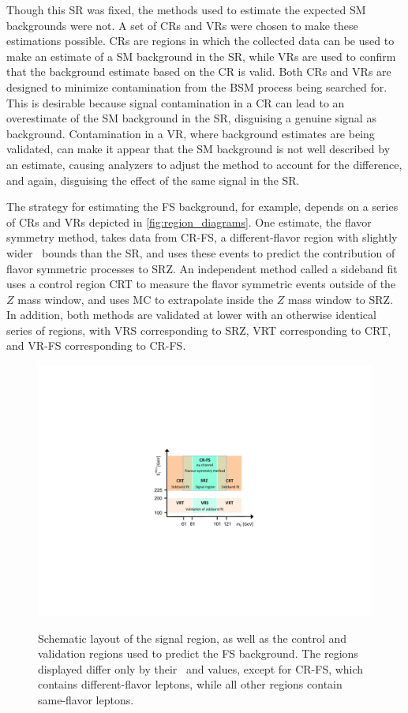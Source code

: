 Though this \ac{SR} was fixed, the methods used to estimate the expected \ac{SM} backgrounds were not. A set of \acfp{CR} and \acfp{VR} were chosen to make these estimations possible. \acp{CR} are regions in which the collected data can be used to make an estimate of a \ac{SM} background in the \ac{SR}, while \acp{VR} are used to confirm that the background estimate based on the \ac{CR} is valid. Both \acp{CR} and \acp{VR} are designed to minimize contamination from the \ac{BSM} process being searched for. This is desirable because signal contamination in a \ac{CR} can lead to an overestimate of the \ac{SM} background in the \ac{SR}, disguising a genuine signal as background. Contamination in a \ac{VR}, where background estimates are being validated, can make it appear that the \ac{SM} background is not well described by an estimate, causing analyzers to adjust the method to account for the difference, and again, disguising the effect of the same signal in the \ac{SR}. 

The strategy for estimating the \ac{FS} background, for example, depends on a series of \acp{CR} and \acp{VR} depicted in \autoref{fig:region_diagrams}. One estimate, the flavor symmetry method, takes data from CR-FS, a different-flavor region with slightly wider \mll~bounds than the \ac{SR}, and uses these events to predict the contribution of flavor symmetric processes to SRZ. An independent method called a sideband fit uses a control region CRT to measure the flavor symmetric events outside of the $Z$ mass window, and uses \ac{MC} to extrapolate inside the $Z$ mass window to SRZ. In addition, both methods are validated at lower \met with an otherwise identical series of regions, with VRS corresponding to SRZ, VRT corresponding to CRT, and VR-FS corresponding to CR-FS. 

\begin{figure}[h]
\centering
\includegraphics[width=.8\textwidth]{figures/fs/FSdiagram_v2.pdf}\\
\caption{
Schematic layout of the signal region, as well as the control and validation regions used to predict the \ac{FS} background. The regions displayed differ only by their \mll~and \met values, except for CR-FS, which contains different-flavor leptons, while all other regions contain same-flavor leptons.
\label{fig:region_diagrams}
}
\end{figure}

